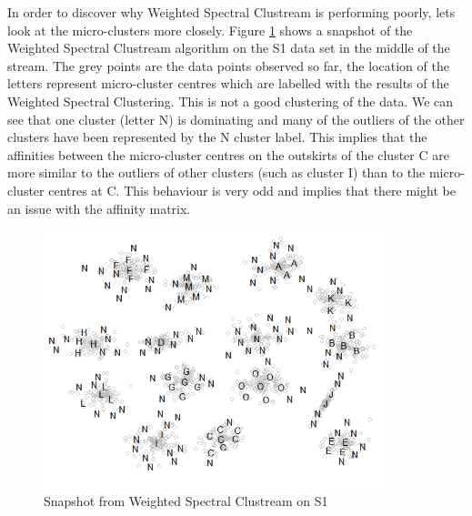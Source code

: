 In order to discover why Weighted Spectral Clustream is performing poorly, lets look at the micro-clusters more closely. Figure \ref{fig:weighted_issues} shows a snapshot of the Weighted Spectral Clustream algorithm on the S1 data set in the middle of the stream. The grey points are the data points observed so far, the location of the letters represent micro-cluster centres which are labelled with the results of the Weighted Spectral Clustering. This is not a good clustering of the data.  We can see that one cluster (letter N) is dominating and many of the outliers of the other clusters have been represented by the N cluster label. This implies that the affinities between the micro-cluster centres on the outskirts of the cluster C are more similar to the outliers of other clusters (such as cluster I) than to the micro-cluster centres at C. This behaviour is very odd and implies that there might be an issue with the  affinity matrix.

\begin{figure}[h]
  \centering
  \includegraphics[width = 10cm]{weighted_issues_N_crop}
  \caption{Snapshot from Weighted Spectral Clustream on S1}
\label{fig:weighted_issues}
\end{figure}

